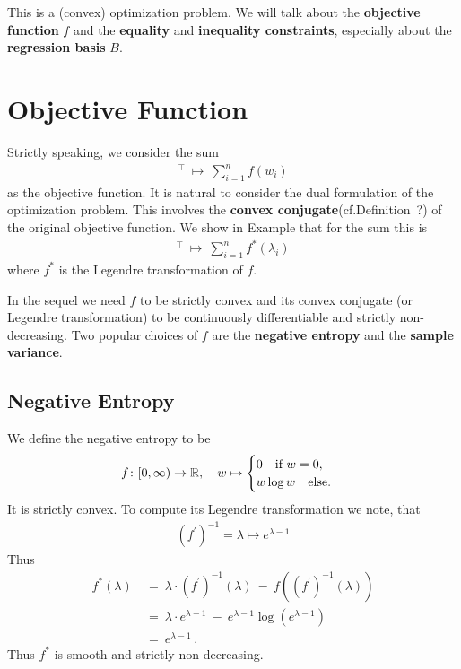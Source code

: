 This is a (convex) optimization problem. We will talk about the \textbf{objective function} $f$ and
the \textbf{equality} and \textbf{inequality constraints}, especially about the 
\textbf{regression basis} $B$.

\section*{Objective Function}
Strictly speaking, we consider the sum
\begin{gather}
  [w_1,\ldots,w_n]^\top
  \ 
  \mapsto
  \ 
  \sum_{i=1}^{n} 
  f(w_i)
\end{gather}
as the objective function. It is natural to consider the dual formulation of the optimization problem. This involves the \textbf{convex conjugate}(cf.Definition~?) of the original objective function. We show in Example that for the sum this is
\begin{gather}
  [\lambda_1,\ldots,\lambda_n]^\top
  \ 
  \mapsto
  \ 
  \sum_{i=1}^{n} 
  f^*(\lambda_i)
\end{gather}
where $f^*$ is the Legendre transformation of $f$.

In the sequel we need $f$ to be strictly convex and its convex conjugate (or Legendre transformation) to be continuously differentiable and strictly non-decreasing.
Two popular choices of $f$ are the \textbf{negative entropy} and the \textbf{sample variance}.
\subsection*{Negative Entropy}
We define the negative entropy to be
\begin{gather}
  f
  \colon
  [0,\infty)
  \to
  \mathbb{R}
  ,\quad
  w
  \mapsto
  \begin{cases}
    0\quad\text{if}\ w=0,\\
    w\log w\quad
    \text{else}.
  \end{cases}
\end{gather}
It is strictly convex. To compute its Legendre transformation we note, that
\begin{gather}
  (f^{'})^{-1}
  =
  \lambda\mapsto
  e^{\lambda-1}
\end{gather}
Thus
  \begin{align*}
  f^*
  (\lambda)
  &
  \ 
  =
  \ 
  \lambda
    \cdot
    (f^{'})^{-1}(\lambda)
  \ 
    -
  \ 
    f
    \left( 
      (f^{'})^{-1}(\lambda)
    \right)
    \\
  &
  \ 
  =
  \ 
  \lambda
    \cdot
  e^{\lambda-1}
  \ 
    -
  \ 
  e^{\lambda-1}
  \log
  \left( 
  e^{\lambda-1}
  \right)
  \\
  &
  \ 
  =
  \ 
  e^{\lambda-1}
  \,.
  \end{align*}
  Thus $f^*$ is smooth and strictly non-decreasing.


